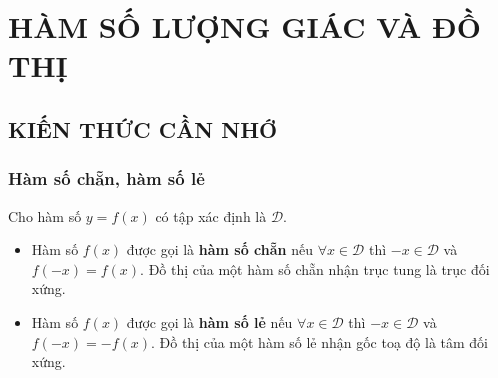 \setcounter{section}{2}
\section{HÀM SỐ LƯỢNG GIÁC VÀ ĐỒ THỊ}
\subsection{KIẾN THỨC CẦN NHỚ}
\subsubsection{Hàm số chẵn, hàm số lẻ}
Cho hàm số $y=f(x)$ có tập xác định là $\mathscr{D}$.
\begin{itemize}
	\item Hàm số $f(x)$ được gọi là \textbf{hàm số chẵn} nếu $\forall x \in \mathscr{D}$ thì $-x \in \mathscr{D}$ và $f(-x)=f(x)$. Đồ thị của một hàm số chẵn nhận trục tung là trục đối xứng.
	\item Hàm số $f(x)$ được gọi là \textbf{hàm số lẻ} nếu $\forall x \in \mathscr{D}$ thì $-x \in \mathscr{D}$ và $f(-x)=-f(x)$. Đồ thị của một hàm số lẻ nhận gốc toạ độ là tâm đối xứng.
\end{itemize}

